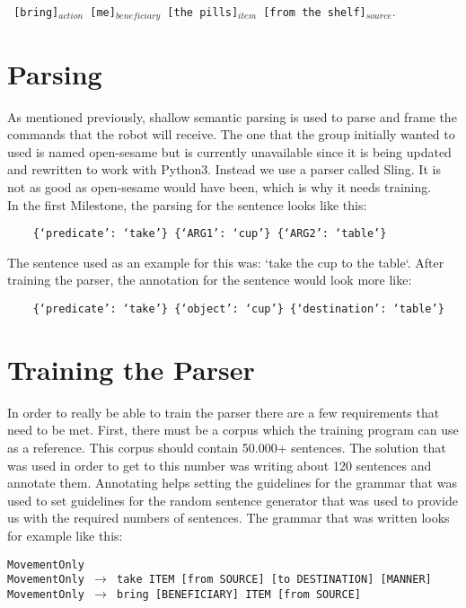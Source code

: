 \documentclass[main.tex]{subfiles}
\begin{document}
	\texttt{ [bring]$_{action}$  [me]$_{beneficiary}$ [the pills]$_{item}$ [from the shelf]$_{source}.$}
	
	\section{Parsing}
	As mentioned previously, shallow semantic parsing is used to parse and frame the commands that the robot will receive. The one that the group initially wanted to used is named open-sesame but is currently unavailable since it is being updated and rewritten to work with Python3. Instead we use a parser called Sling. It is not as good as open-sesame would have been, which is why it needs training.\\ 
	In the first Milestone, the parsing for the sentence looks like this:

	\begin{verbatim}
	{‘predicate’: ‘take’} {‘ARG1’: ‘cup’} {‘ARG2’: ‘table’}
	\end{verbatim}

	The sentence used as an example for this was: ‘take the cup to the table‘. After training the parser, the annotation for the sentence would look more like:

	\begin{verbatim}
	{‘predicate’: ‘take’} {‘object’: ‘cup’} {‘destination’: ‘table’}
	\end{verbatim}
	
	\section{Training the Parser}
	In order to really be able to train the parser there are a few requirements that need to be met. First, there must be a corpus which the training program can use as a reference. This corpus should contain 50.000+ sentences. The solution that was used in order to get to this number was writing about 120 sentences and annotate them. Annotating helps setting the guidelines for the grammar that was used to set guidelines for the random sentence generator that was used to provide us with the required numbers of sentences.
	The grammar that was written looks for example like this:

		
		\texttt{MovementOnly\\
		MovementOnly $\rightarrow$ take ITEM [from SOURCE] [to DESTINATION] [MANNER]\\
		MovementOnly $\rightarrow$ bring [BENEFICIARY] ITEM [from SOURCE]\\}
		
\end{document}
